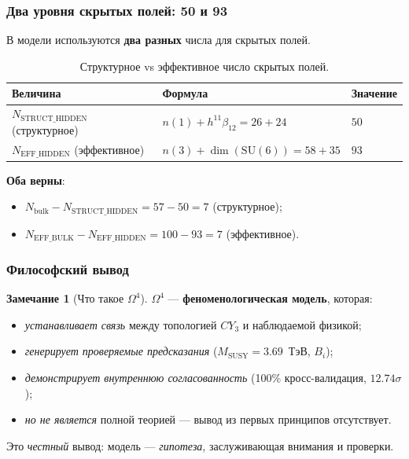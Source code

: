 \documentclass[11pt,a4paper]{article}
\newcommand{\SU}{\ensuremath{\mathrm{SU}}}
\newcommand{\CY}{\ensuremath{CY_3}}
\newcommand{\Om}{\ensuremath{\Omega^4}}
\theoremstyle{definition}
\newtheorem{remark}[theorem]{Замечание}
\begin{document}
\subsubsection{Два уровня скрытых полей: 50 и 93}

В модели используются \textbf{два разных} числа для скрытых полей.

\begin{table}[ht]
\centering
\caption{Структурное vs эффективное число скрытых полей.}
\label{tab:two-hidden-numbers}
\begin{tabular}{lll}
\toprule
Величина & Формула & Значение \\
\midrule
$N_{\text{STRUCT\_HIDDEN}}$ (структурное) & $n(1) + h^{11}\beta_{12} = 26 + 24$ & $50$ \\
$N_{\text{EFF\_HIDDEN}}$ (эффективное) & $n(3) + \dim(\SU(6)) = 58 + 35$ & $93$ \\
\bottomrule
\end{tabular}
\end{table}

\noindent
\textbf{Оба верны}:
\begin{itemize}
    \item $N_{\text{bulk}} - N_{\text{STRUCT\_HIDDEN}} = 57 - 50 = 7$ (структурное);
    \item $N_{\text{EFF\_BULK}} - N_{\text{EFF\_HIDDEN}} = 100 - 93 = 7$ (эффективное).
\end{itemize}                                  

\subsubsection{Философский вывод}

\begin{remark}[Что такое $\Om$]
\label{rem:what-is-omega4}
$\Om$ --- \textbf{феноменологическая модель}, которая:
\begin{itemize}
    \item \emph{устанавливает связь} между топологией $\CY$
          и наблюдаемой физикой;
    \item \emph{генерирует проверяемые предсказания}
          ($M_{\text{SUSY}} = 3.69$~ТэВ, $B_i$);
    \item \emph{демонстрирует внутреннюю согласованность}
          (100\% кросс-валидация, $12.74\sigma$);
    \item \emph{но не является} полной теорией ---
          вывод из первых принципов отсутствует.
\end{itemize}
Это \emph{честный} вывод: модель --- \emph{гипотеза},
заслуживающая внимания и проверки.
\end{remark}
\end{document}
